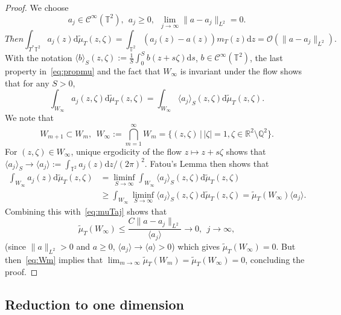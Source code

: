 \documentclass[11pt]{article}
\theoremstyle{definition}
\numberwithin{equation}{section}
\numberwithin{figure}{section}
\numberwithin{table}{section}
\newcommand{\CI}{{\mathcal C}^\infty }
\newcommand{\R}{{\mathbb R}}
\newcommand{\TT}{{\mathbb T}}
\newcommand*{\dd}{\mathrm{d}}
\newcommand*{\dz}{\dd z}
\newcommand*{\ds}{\dd s}
\newcommand*{\dwmu}{\dd \widetilde\mu}
\newcommand*{\tq}{\,|\,}
\begin{document}
\begin{proof}
We choose
\begin{equation}\label{eq:aj}
a_j \in \CI (\TT^2), \ \ a_j \geq 0, \ \
\lim_{ j \to \infty } \| a - a_j\|_{L^2 } = 0.
\end{equation}
\begin{equation}
Then\label{eq:muTaj}
\int_{T^* \TT^2 } a_j (z) \dwmu_T (z,\zeta) = \int_{ \TT^2 } (a_j (z) - a (z)) m_T (z) \dz = \mathcal O (\| a - a_j \|_{L^2 }).
\end{equation}
With the notation $ \langle b \rangle_S (z, \zeta) := \frac{1}{S} \int_{ 0}^S b (z + s \zeta) \ds $, $ b \in \CI (\TT^2) $, the last property in~\eqref{eq:propmu} and the fact that $ W_\infty $ is invariant under the flow shows that for any $ S > 0 $,
\[
\int_{W_\infty } a_j (z,\zeta) \dwmu_T (z,\zeta) =
\int_{W_\infty } \langle a_j \rangle_S (z, \zeta) \dwmu_T (z,\zeta).
\]
We note that
\begin{equation}\label{eq:Wm}
W_{m+1} \subset W_m, \ \ W_\infty := \bigcap_{ m =1}^\infty W_m = \{(z, \zeta) \tq |\zeta|=1,
\zeta \in \R^2 \setminus \mathbb Q^2 \}.
\end{equation}
For $ (z, \zeta) \in W_\infty $, unique ergodicity of the flow $ z \mapsto z + s \zeta $ shows that $ \langle a_j \rangle_S \to \langle a_j
\rangle := \int_{\TT^2} a_j (z) \dz / (2 \pi)^2. $ Fatou's Lemma then shows that
\[
\begin{split} \int_{W_\infty } a_j (z) \dwmu_T (z,\zeta)
& = \liminf_{ S \to \infty } \int_{W_\infty } \langle a_j \rangle_S (z, \zeta) \dwmu_T (z,\zeta) \\
& \geq \int_{W_\infty} \liminf_{ S \to \infty } \langle a_j \rangle_S (z, \zeta) \dwmu_T (z,\zeta) = \widetilde \mu_T (W_\infty) \langle a_j \rangle.
\end{split}
\]
Combining this with~\eqref{eq:muTaj} shows that
\[
\widetilde \mu_T (W_\infty) \leq \frac{ C \| a - a_j \|_{L^2 } } {\langle a_j \rangle} \rightarrow 0, \ \ j \to \infty,
\]
(since $ \| a \|_{L^2 } > 0 $ and $ a \geq 0 $, $ \langle a_j \rangle
\to \langle a \rangle > 0 $) which gives $ \widetilde \mu_T (W_\infty) = 0 $. But then~\eqref{eq:Wm} implies that $ \lim_{ m \to \infty } \widetilde \mu_T (W_m) = \widetilde \mu_T (W_\infty) = 0 $, concluding the proof.
\end{proof}

\subsection{Reduction to one dimension}
\end{document}
